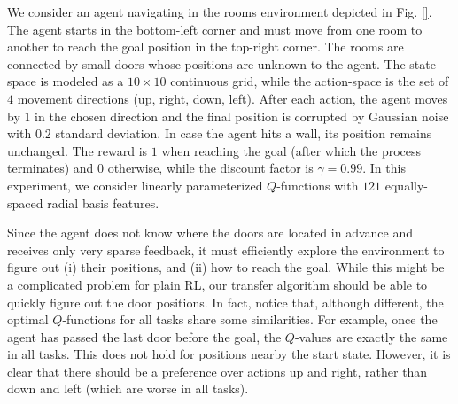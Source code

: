 \documentclass{article}
\begin{document}
We consider an agent navigating in the rooms environment depicted in Fig. \ref{}. The agent starts in the bottom-left corner and must move from one room to another to reach the goal position in the top-right corner. The rooms are connected by small doors whose positions are unknown to the agent. The state-space is modeled as a $10 \times 10$ continuous grid, while the action-space is the set of $4$ movement directions (up, right, down, left). After each action, the agent moves by $1$ in the chosen direction and the final position is corrupted by Gaussian noise with $0.2$ standard deviation. In case the agent hits a wall, its position remains unchanged. The reward is $1$ when reaching the goal (after which the process terminates) and $0$ otherwise, while the discount factor is $\gamma = 0.99$. In this experiment, we consider linearly parameterized $Q$-functions with $121$ equally-spaced radial basis features.

Since the agent does not know where the doors are located in advance and receives only very sparse feedback, it must efficiently explore the environment to figure out (i) their positions, and (ii) how to reach the goal. While this might be a complicated problem for plain RL, our transfer algorithm should be able to quickly figure out the door positions. In fact, notice that, although different, the optimal $Q$-functions for all tasks share some similarities. For example, once the agent has passed the last door before the goal, the $Q$-values are exactly the same in all tasks. This does not hold for positions nearby the start state. However, it is clear that there should be a preference over actions up and right, rather than down and left (which are worse in all tasks).
\end{document}
